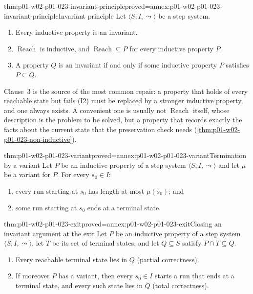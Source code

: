 \begin{hbtheorem}{thm:p01-w02-p01-023-invariant-principle}{proved=annex:p01-w02-p01-023-invariant-principle}{Invariant principle}
Let \(\langle S,I,\leadsto\rangle\) be a step system.
\begin{enumerate}
  \item Every inductive property is an invariant.
  \item \(\operatorname{Reach}\) is inductive, and
        \(\operatorname{Reach}\subseteq P\) for every inductive property
        \(P\).
  \item A property \(Q\) is an invariant if and only if some inductive
        property \(P\) satisfies \(P\subseteq Q\).
\end{enumerate}
\end{hbtheorem}

Clause~3 is the source of the most common repair: a property that holds of
every reachable state but fails (I2) must be replaced by a stronger
inductive property, and one always exists. A convenient one is usually not
\(\operatorname{Reach}\) itself, whose description is the problem to be
solved, but a property that records exactly the facts about the current
state that the preservation check needs
(\cref{thm:p01-w02-p01-023-non-inductive}).

\begin{hblemma}{thm:p01-w02-p01-023-variant}{proved=annex:p01-w02-p01-023-variant}{Termination by a variant}
Let \(P\) be an inductive property of a step system
\(\langle S,I,\leadsto\rangle\) and let \(\mu\) be a variant for \(P\).
For every \(s_0\in I\):
\begin{enumerate}
  \item every run starting at \(s_0\) has length at most \(\mu(s_0)\); and
  \item some run starting at \(s_0\) ends at a terminal state.
\end{enumerate}
\end{hblemma}

\begin{hbcorollary}{thm:p01-w02-p01-023-exit}{proved=annex:p01-w02-p01-023-exit}{Closing an invariant argument at the exit}
Let \(P\) be an inductive property of a step system
\(\langle S,I,\leadsto\rangle\), let \(T\) be its set of terminal states,
and let \(Q\subseteq S\) satisfy \(P\cap T\subseteq Q\).
\begin{enumerate}
  \item Every reachable terminal state lies in \(Q\) (partial correctness).
  \item If moreover \(P\) has a variant, then every \(s_0\in I\) starts a
        run that ends at a terminal state, and every such state lies in
        \(Q\) (total correctness).
\end{enumerate}
\end{hbcorollary}

